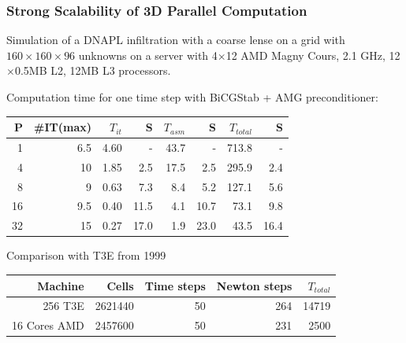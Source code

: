 \begin{frame}
\frametitle<presentation>{Strong Scalability of 3D Parallel Computation}
Simulation of a DNAPL infiltration with a coarse lense on a grid with  $160 \times 160 \times 96$
unknowns on a server with 4$\times$12  AMD Magny Cours, 2.1 GHz, 12$\times$0.5MB L2, 12MB
L3 processors.

Computation time for one time step with BiCGStab + AMG preconditioner:

\begin{center}
\begin{tabular}{r|rrr|rr|rr}
\hline
P  & \#IT(max) & $T_{it}$ & S & $T_{asm}$ & S & $T_{total}$ & S \\
\hline
 1  &  6.5 & 4.60 &      - &  43.7 &      - & 713.8 &    - \\
 4  &  10  & 1.85 &   2.5 &  17.5 &   2.5 & 295.9 & 2.4 \\
 8  &  9    & 0.63 &   7.3 &    8.4 &   5.2 & 127.1 & 5.6 \\
16 &  9.5 & 0.40 & 11.5 &    4.1 & 10.7 &   73.1 & 9.8 \\
32 &  15  & 0.27 & 17.0 &    1.9 & 23.0 &   43.5 & 16.4 \\ 
\hline
\end{tabular}
\end{center} 

Comparison with T3E from 1999

\begin{center}
\begin{tabular}{r|rrrr}
\hline
Machine  & Cells & Time steps & Newton steps & $T_{total}$ \\
\hline
256 T3E        & 2621440 &  50 & 264 & 14719\\
16 Cores AMD & 2457600 & 50 & 231 & 2500\\ 
\hline
\end{tabular}
\end{center} 
\end{frame}


